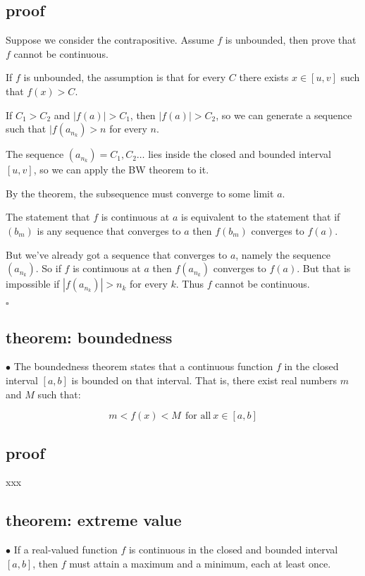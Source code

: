 \documentclass[11pt, oneside]{article}
\begin{document}
\subsection*{proof}

Suppose we consider the contrapositive.  Assume $f$ is unbounded, then prove that $f$ cannot be continuous.

If $f$ is unbounded, the assumption is that for every $C$ there exists $x \in [u,v]$ such that $f(x) > C$.  

If $C_1 > C_2$ and $|f(a)| > C_1$, then $|f(a)| > C_2$, so we can generate a sequence such that $|f(a_{n_k}) > n$ for every $n$.  

The sequence $(a_{n_k}) = C_1, C_2 \dots$ lies inside the closed and bounded interval $[u,v]$, so we can apply the BW theorem to it.

By the theorem, the subsequence must converge to some limit $a$.

The statement that $f$ is continuous at $a$ is equivalent to the statement that if $(b_m)$ is any sequence that converges to $a$ then $f(b_m)$ converges to $f(a)$. 

But we've already got a sequence that converges to $a$, namely the sequence $(a_{n_k})$. So if $f$ is continuous at $a$ then $f(a_{n_k})$ converges to $f(a)$. But that is impossible if $|f(a_{n_k})|>n_k$ for every $k$.  Thus $f$ cannot be continuous.

$\square$


\subsection*{theorem:  boundedness}

$\bullet$  The boundedness theorem states that a continuous function $f$ in the closed interval $[a,b]$ is bounded on that interval. That is, there exist real numbers $m$ and $M$ such that:

\[ m < f(x) < M \ \ \text{for all} \ x \in [a,b] \]

\subsection*{proof}

xxx

\subsection*{theorem:  extreme value}

$\bullet$  If a real-valued function $f$ is continuous in the closed and bounded interval $[a,b]$, then $f$ must attain a maximum and a minimum, each at least once.  
\end{document}
